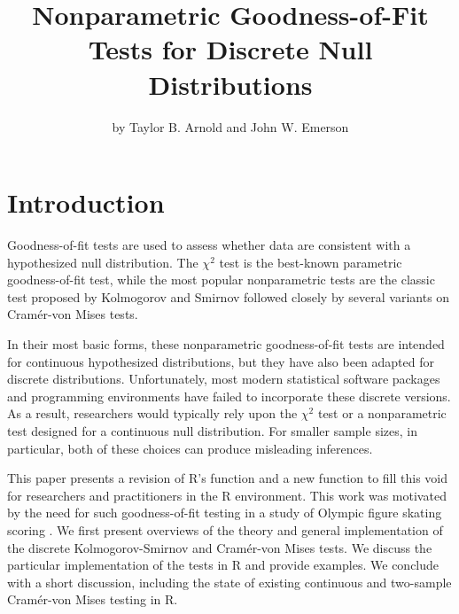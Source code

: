 \title{Nonparametric Goodness-of-Fit Tests for Discrete Null Distributions}
\author{by Taylor B. Arnold and John W. Emerson}

\maketitle


\section{Introduction}

Goodness-of-fit tests are used to assess whether data are consistent
with a hypothesized null distribution.  The $\chi^2$ test is the best-known
parametric goodness-of-fit test, while the most popular nonparametric tests
are the classic test proposed by Kolmogorov and Smirnov followed closely by
several variants on Cram\'{e}r-von Mises tests.

In their most basic forms, these nonparametric goodness-of-fit
tests are intended for continuous hypothesized distributions, but they have
also been adapted for discrete distributions.  Unfortunately,
most modern statistical software packages and programming environments
have failed to incorporate these discrete versions.  As a result,
researchers would typically rely upon the $\chi^2$ test or
a nonparametric test designed for a continuous null distribution.
For smaller sample sizes, in particular, both of these choices can produce
misleading inferences.

This paper presents a revision of R's
 function and a new  function to
fill this void for researchers and practitioners in the R environment. This
work was motivated by the need for such goodness-of-fit testing in a study
of Olympic figure skating scoring \citep{emersonarnold2010}.  
We first present overviews of the theory and general implementation of the
discrete Kolmogorov-Smirnov and Cram\'{e}r-von Mises tests.  We discuss
the particular implementation of the tests in R and provide examples.  We
conclude with a short discussion, including the state of existing continuous
and two-sample Cram\'{e}r-von Mises testing in R.

